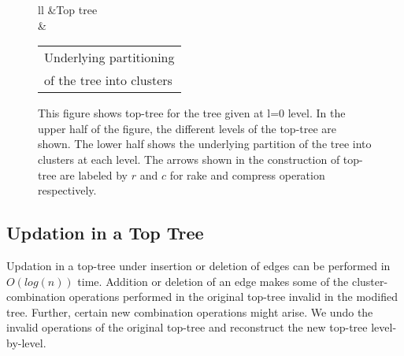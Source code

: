 \documentclass[a4paper,12pt]{article}
\begin{document}
\begin{figure}
\begin{tabular}{ll}
&Top tree\\
&\begin{tabular}{l}Underlying partitioning\\of the tree into clusters\end{tabular}
\end{tabular}
\caption{This figure shows top-tree for the tree given at l=0 level. In the upper half of the figure, the different levels of the top-tree are shown. The lower half shows the underlying partition of the tree into clusters at each level. The arrows shown in the construction of top-tree are labeled by $r$ and $c$ for rake and compress operation respectively.}
\label{top-tree-example}
\end{figure}

\subsection{Updation in a Top Tree}
Updation in a top-tree under insertion or deletion of edges can be performed in $O(log(n))$ time. Addition or deletion of an edge makes some of the cluster-combination operations performed in the original top-tree invalid in the modified tree. Further, certain new combination operations might arise. We undo the invalid operations of the original top-tree and reconstruct the new top-tree level-by-level.
\end{document}
